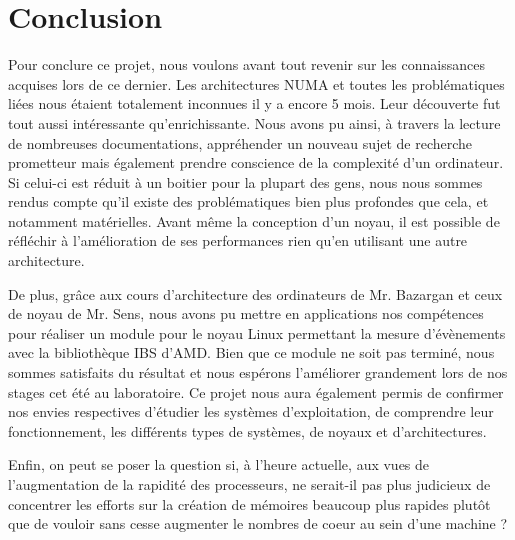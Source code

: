 \pagestyle{plain}
\chapter*{Conclusion}

  Pour conclure ce projet, nous voulons avant tout revenir sur les connaissances
  acquises lors de ce dernier. Les architectures NUMA et toutes les
  problématiques liées nous étaient totalement inconnues il y a encore 5
  mois. Leur découverte fut tout aussi intéressante qu'enrichissante. Nous avons
  pu ainsi, à travers la lecture de nombreuses documentations, appréhender un
  nouveau sujet de recherche prometteur mais également prendre conscience de la
  complexité d'un ordinateur. Si celui-ci est réduit à un boitier pour la
  plupart des gens, nous nous sommes rendus compte qu'il existe des
  problématiques bien plus profondes que cela, et notamment matérielles. Avant
  même la conception d'un noyau, il est possible de réfléchir à l'amélioration
  de ses performances rien qu'en utilisant une autre architecture.\newline


  De plus, grâce aux cours d'architecture des ordinateurs de Mr. Bazargan et
  ceux de noyau de Mr. Sens, nous avons pu mettre en applications nos
  compétences pour réaliser un module pour le noyau Linux permettant la mesure
  d'évènements avec la bibliothèque IBS d'AMD. Bien que ce module ne soit pas
  terminé, nous sommes satisfaits du résultat et nous espérons l'améliorer
  grandement lors de nos stages cet été au laboratoire. Ce projet nous aura
  également permis de confirmer nos envies respectives d'étudier les systèmes
  d'exploitation, de comprendre leur fonctionnement, les différents types de
  systèmes, de noyaux et d'architectures.\newline

  Enfin, on peut se poser la question si, à l'heure actuelle, aux vues de
  l'augmentation de la rapidité des processeurs, ne serait-il pas plus judicieux
  de concentrer les efforts sur la création de mémoires beaucoup plus rapides
  plutôt que de vouloir sans cesse augmenter le nombres de coeur au sein d'une
  machine ?




